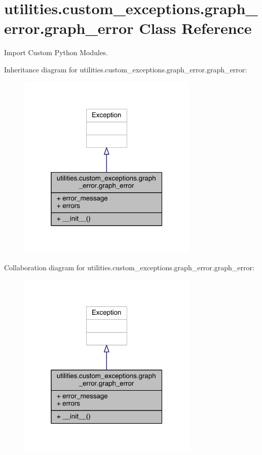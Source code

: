 \hypertarget{classutilities_1_1custom__exceptions_1_1graph__error_1_1graph__error}{}\section{utilities.\+custom\+\_\+exceptions.\+graph\+\_\+error.\+graph\+\_\+error Class Reference}
\label{classutilities_1_1custom__exceptions_1_1graph__error_1_1graph__error}


Import Custom Python Modules.  




Inheritance diagram for utilities.\+custom\+\_\+exceptions.\+graph\+\_\+error.\+graph\+\_\+error\+:
\nopagebreak
\begin{figure}[H]
\begin{center}
\leavevmode
\includegraphics[width=244pt]{d4/d9a/classutilities_1_1custom__exceptions_1_1graph__error_1_1graph__error__inherit__graph}
\end{center}
\end{figure}


Collaboration diagram for utilities.\+custom\+\_\+exceptions.\+graph\+\_\+error.\+graph\+\_\+error\+:
\nopagebreak
\begin{figure}[H]
\begin{center}
\leavevmode
\includegraphics[width=244pt]{d6/d8d/classutilities_1_1custom__exceptions_1_1graph__error_1_1graph__error__coll__graph}
\end{center}
\end{figure}
